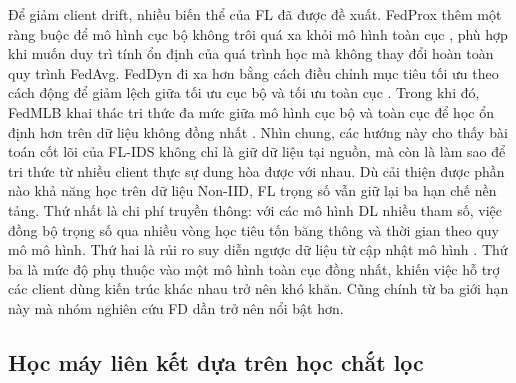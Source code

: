 \bigbreak\noindent
Để giảm client drift, nhiều biến thể của FL đã được đề xuất. FedProx thêm một ràng buộc để mô hình cục bộ không trôi quá xa khỏi mô hình toàn cục \cite{li2020fedprox}, phù hợp khi muốn duy trì tính ổn định của quá trình học mà không thay đổi hoàn toàn quy trình FedAvg. FedDyn đi xa hơn bằng cách điều chỉnh mục tiêu tối ưu theo cách động để giảm lệch giữa tối ưu cục bộ và tối ưu toàn cục \cite{acar2021feddyn}. Trong khi đó, FedMLB khai thác tri thức đa mức giữa mô hình cục bộ và toàn cục để học ổn định hơn trên dữ liệu không đồng nhất \cite{kim2022fedmlb}. Nhìn chung, các hướng này cho thấy bài toán cốt lõi của FL-IDS không chỉ là giữ dữ liệu tại nguồn, mà còn là làm sao để tri thức từ nhiều client thực sự dung hòa được với nhau.
\bigbreak\noindent
Dù cải thiện được phần nào khả năng học trên dữ liệu Non-IID, FL trọng số vẫn giữ lại ba hạn chế nền tảng. Thứ nhất là chi phí truyền thông: với các mô hình DL nhiều tham số, việc đồng bộ trọng số qua nhiều vòng học tiêu tốn băng thông và thời gian theo quy mô mô hình. Thứ hai là rủi ro suy diễn ngược dữ liệu từ cập nhật mô hình \cite{zhu2019dlg,zhao2020idlg,geiping2020inverting}. Thứ ba là mức độ phụ thuộc vào một mô hình toàn cục đồng nhất, khiến việc hỗ trợ các client dùng kiến trúc khác nhau trở nên khó khăn. Cũng chính từ ba giới hạn này mà nhóm nghiên cứu FD dần trở nên nổi bật hơn.

\subsection{Học máy liên kết dựa trên học chắt lọc}

